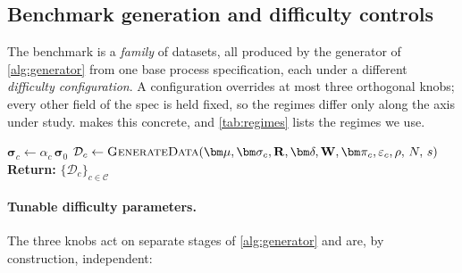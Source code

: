 
\subsection{Benchmark generation and difficulty controls}
\label{subsec:benchmark}

The benchmark is a \emph{family} of datasets, all produced by the generator of
\cref{alg:generator} from one base process specification, each under a different
\emph{difficulty configuration}. A configuration overrides at most three orthogonal
knobs; every other field of the spec is held fixed, so the regimes differ only along
the axis under study.  makes this concrete, and
\cref{tab:regimes} lists the regimes we use.

\begin{algorithm}[t]
\caption{Benchmark suite generation}
\label{alg:benchmark}
\DontPrintSemicolon
{}
    \BlankLine
    $\bm\sigma_c \leftarrow \alpha_c\,\bm\sigma_0$\;
    \BlankLine
    $\mathcal D_c \leftarrow \textsc{GenerateData}(\bm\mu,\bm\sigma_c,\mathbf R,\bm\delta,\mathbf W,\bm\pi_c,\varepsilon_c,\rho,\,N,\,s)$\;
    \BlankLine
    \textbf{Return:} $\{\mathcal D_c\}_{c\in\mathcal C}$\;
\end{algorithm}

\paragraph{Tunable difficulty parameters.}
The three knobs act on separate stages of \cref{alg:generator} and are, by construction,
independent:

